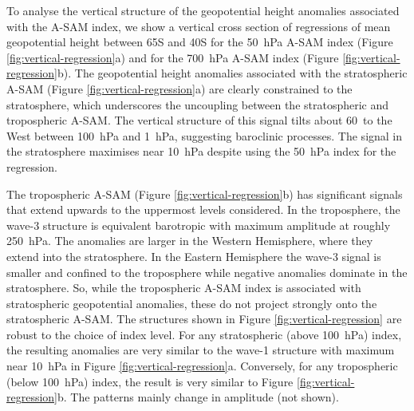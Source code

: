 \documentclass[smallextended]{svjour3}       %
\begin{document}
To analyse the vertical structure of the geopotential height anomalies associated with the A\nobreakdash-SAM index, we show a vertical cross section of regressions of mean geopotential height between 65\degree S and 40\degree S for the 50~hPa A\nobreakdash-SAM index (Figure \ref{fig:vertical-regression}a) and for the 700~hPa A\nobreakdash-SAM index (Figure \ref{fig:vertical-regression}b).
The geopotential height anomalies associated with the stratospheric A\nobreakdash-SAM (Figure \ref{fig:vertical-regression}a) are clearly constrained to the stratosphere, which underscores the uncoupling between the stratospheric and tropospheric A\nobreakdash-SAM.
The vertical structure of this signal tilts about 60\degree~to the West between 100~hPa and 1~hPa, suggesting baroclinic processes.
The signal in the stratosphere maximises near 10~hPa despite using the 50~hPa index for the regression.

The tropospheric A\nobreakdash-SAM (Figure \ref{fig:vertical-regression}b) has significant signals that extend upwards to the uppermost levels considered.
In the troposphere, the wave-3 structure is equivalent barotropic with maximum amplitude at roughly 250~hPa.
The anomalies are larger in the Western Hemisphere, where they extend into the stratosphere.
In the Eastern Hemisphere the wave-3 signal is smaller and confined to the troposphere while negative anomalies dominate in the stratosphere.
So, while the tropospheric A\nobreakdash-SAM index is associated with stratospheric geopotential anomalies, these do not project strongly onto the stratospheric A\nobreakdash-SAM.
The structures shown in Figure \ref{fig:vertical-regression} are robust to the choice of index level.
For any stratospheric (above 100~hPa) index, the resulting anomalies are very similar to the wave-1 structure with maximum near 10~hPa in Figure \ref{fig:vertical-regression}a.
Conversely, for any tropospheric (below 100~hPa) index, the result is very similar to Figure \ref{fig:vertical-regression}b.
The patterns mainly change in amplitude (not shown).
\end{document}
